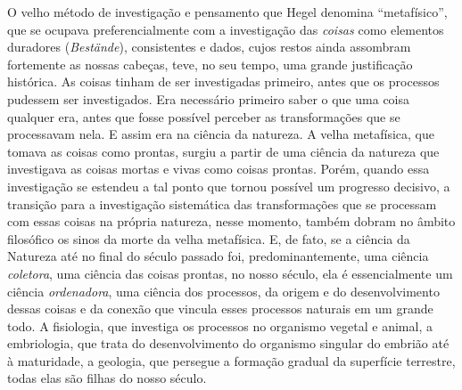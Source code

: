 O velho método de investigação e pensamento
que Hegel 
denomina ``metafísico'', que se ocupava preferencialmente com a
investigação das \emph{coisas }como elementos duradores
(\emph{Bestände}), consistentes e dados, cujos restos ainda assombram
fortemente as nossas cabeças, teve, no seu tempo, uma grande
justificação histórica. As coisas tinham de ser investigadas primeiro,
antes que os processos pudessem ser investigados. Era necessário
primeiro saber o que uma coisa qualquer era, antes que fosse possível
perceber as transformações que se processavam nela. E assim era na
ciência da natureza. A velha metafísica, que tomava as coisas como
prontas, surgiu a partir de uma ciência da natureza que investigava as
coisas mortas e vivas como coisas prontas. Porém, quando essa
investigação se estendeu a tal ponto que tornou possível um progresso
decisivo, a transição para a investigação sistemática das transformações
que se processam com essas coisas na própria natureza, nesse momento,
também dobram no âmbito filosófico os sinos da morte da velha
metafísica. E, de fato, se a ciência da Natureza até no final do século
passado foi, predominantemente, uma ciência \emph{coletora}, uma ciência
das coisas prontas, no nosso século, ela é essencialmente um
ciência \emph{ordenadora}, uma ciência dos processos, da origem e do
desenvolvimento dessas coisas e da conexão que vincula esses processos
naturais em um grande todo. A fisiologia, que investiga os processos no
organismo vegetal e animal, a embriologia, que trata do desenvolvimento
do organismo singular do embrião até à maturidade, a geologia, que
persegue a formação gradual da superfície terrestre, todas elas são
filhas do nosso século.

